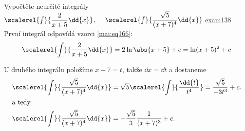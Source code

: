 \begin{mathexam}{Vypočtěte neurčité integrály \\ \(\scalerel{\int}{\dfrac{2}{x+5}\dd{x}}\),
  \(\quad\scalerel{\int}{\dfrac{\sqrt{5}}{(x+7)^4}\dd{x}}\) \hfill\cite[s.~71]{Knichal}}{exam138}
    První integrál odpovídá vzorci \ref{mai:eq166}:
    \begin{equation*}
      \scalerel{\int}{\dfrac{2}{x+5}\dd{x}} = 2\ln\abs{x+5} + c = \ln(x+5)^2 + c
    \end{equation*}

    U druhého integrálu položíme \(x+7 = t\), takže \(\dd{x} = \dd{t}\) a dostaneme
    \begin{align*}
      \scalerel{\int}{\dfrac{\sqrt{5}}{(x+7)^4}\dd{x}} &= 
      \sqrt{5}\scalerel{\int}{\dfrac{\dd{t}}{t^4}} = \dfrac{\sqrt{5}}{-3t^3} + c.   \\
      \shortintertext{a tedy}
      \scalerel{\int}{\dfrac{\sqrt{5}}{(x+7)^4}\dd{x}} &=-\dfrac{\sqrt{5}}{3}\dfrac{1}{(x+7)^3} + c.
    \end{align*}
\end{mathexam}